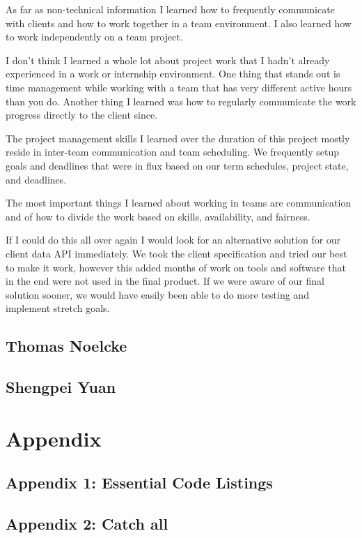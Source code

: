 \documentclass[onecolumn, draftclsnofoot,10pt, compsoc]{article}
\begin{document}
        As far as non-technical information I learned how to frequently communicate with clients and how to work together in a team environment. I also learned how to work independently on a team project.
        
        I don't think I learned a whole lot about project work that I hadn't already experienced in a work or internship environment. One thing that stands out is time management while working with a team that has very different active hours than you do. Another thing I learned was how to regularly communicate the work progress directly to the client since.
        
        The project management skills I learned over the duration of this project mostly reside in inter-team communication and team scheduling. We frequently setup goals and deadlines that were in flux based on our term schedules, project state, and deadlines.
        
        The most important things I learned about working in teams are communication and of how to divide the work based on skills, availability, and fairness. 
        
        If I could do this all over again I would look for an alternative solution for our client data API immediately. We took the client specification and tried our best to make it work, however this added months of work on tools and software that in the end were not used in the final product. If we were aware of our final solution sooner, we would have easily been able to do more testing and implement stretch goals.

        
    
    \subsection{Thomas Noelcke}
    
    
    \subsection{Shengpei Yuan}

\section{Appendix}    

    \subsection{Appendix 1: Essential Code Listings}

    \subsection{Appendix 2: Catch all}
    
\end{document}
